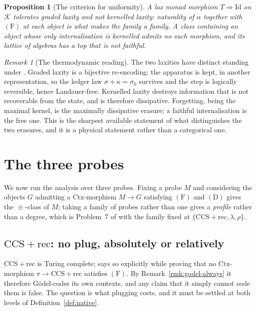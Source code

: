 \documentclass[11pt,a4paper]{article}
\theoremstyle{definition}
\theoremstyle{plain}
\newtheorem{proposition}[definition]{Proposition}
\theoremstyle{remark}
\newtheorem{remark}[definition]{Remark}
\newcommand{\CtxC}{\mathrm{Ctx}}
\newcommand{\rhoc}{\rho}
\newcommand{\CCSrec}{\mathrm{CCS}{+}\mathrm{rec}}
\newcommand{\Fcond}{(\mathrm{F})}
\newcommand{\Dcond}{(\mathrm{D})}
\begin{document}
\begin{proposition}[The criterion for uniformity]
\label{prop:criterion}
A lax monad morphism $T \Rightarrow \mathrm{Id}$ on $\mathcal{K}$ tolerates graded laxity and not
kernelled laxity: naturality of $\alpha$ together with $\Fcond$ at each object is what makes the
family a family. A class containing an object whose only internalisation is kernelled admits no such
morphism, and its lattice of algebras has a top that is not faithful.
\end{proposition}

\begin{remark}[The thermodynamic reading]
\label{rmk:landauer}
The two laxities have distinct standing under \cite[Rmk.~7.2]{history}. Graded laxity is a bijective
re-encoding: the apparatus is kept, in another representation, so the ledger law
$\sigma + \kappa = \sigma_0$ survives and the step is logically reversible, hence Landauer-free.
Kernelled laxity destroys information that is not recoverable from the state, and is therefore
dissipative. Forgetting, being the maximal kernel, is the maximally dissipative erasure; a faithful
internalisation is the free one. This is the sharpest available statement of what distinguishes the
two erasures, and it is a physical statement rather than a categorical one.
\end{remark}

\section{The three probes}
\label{sec:probes}

We now run the analysis over three probes. Fixing a probe $M$ and considering the objects $G$
admitting a $\CtxC$-morphism $M \to G$ satisfying $\Fcond$ and $\Dcond$ gives the $\equiv$-class of
$M$; taking a family of probes rather than one gives a \emph{profile} rather than a degree, which is
Problem~7 of \cite{probe} with the family fixed at $\{\CCSrec, \lambda, \rhoc\}$.

\subsection{$\CCSrec$: no plug, absolutely or relatively}

$\CCSrec$ is Turing complete; \cite[Cor.~5.10]{probe} says so explicitly while proving that no
$\CtxC$-morphism $\pi \to \CCSrec$ satisfies $\Fcond$. By Remark~\ref{rmk:godel-always} it therefore
Gödel-codes its own contexts, and any claim that it simply cannot code them is false. The question is
what plugging costs, and it must be settled at both levels of Definition~\ref{def:native}.
\end{document}
